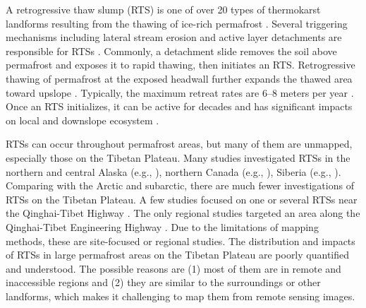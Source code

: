 \documentclass[preprint,12pt,authoryear]{elsarticle}
\begin{document}
A retrogressive thaw slump (RTS) is one of over 20 types of thermokarst landforms resulting from the thawing of ice-rich permafrost \citep{czudek_thermokarst_1970, jorgenson_response_2005, jorgenson_thermokarst_2013,kokelj2013advances}. Several triggering mechanisms including lateral stream erosion and active layer detachments are responsible for RTSs \citep{french2017periglacial}. Commonly, a detachment slide removes the soil above permafrost and exposes it to rapid thawing, then initiates an RTS. Retrogressive thawing of permafrost at the exposed headwall further expands the thawed area toward upslope \citep{jorgenson_thermokarst_2013}. Typically, the maximum retreat rates are 6--8 meters per year \citep{jorgenson_thermokarst_2013}. Once an RTS initializes, it can be active for decades \citep{burn1989geomorphology, lacelle2010climatic, swanson2018growth,lewkowicz2019extremes} and has significant impacts on local and downslope ecosystem \citep{gooseff2009effects, pierre2018unprecedented, zolkos2018mineral}. 

RTSs can occur throughout permafrost areas, but many of them are unmapped, especially those on the Tibetan Plateau. Many studies investigated RTSs in the northern and central Alaska (e.g., \citealp{swanson2018growth,balser2014timing}), northern Canada (e.g., \citealp{burn1990canadian, cassidy2017impacts, armstrong2018thaw,lewkowicz2019extremes}), Siberia (e.g., \citealp{leibman2003dynamics, zwieback2018sub}). %
Comparing with the Arctic and subarctic, there are much fewer investigations of RTSs on the Tibetan Plateau. A few studies focused on one or several RTSs near the Qinghai-Tibet Highway \citep{wang1995situ,sun2017creep}. The only regional studies targeted an area along the Qinghai-Tibet Engineering Highway \citep{niu2014thaw, niu2016thaw}. Due to the limitations of mapping methods, these are site-focused or regional studies. The distribution and impacts of RTSs in large permafrost areas on the Tibetan Plateau are poorly quantified and understood. The possible reasons are (1) most of them are in remote and inaccessible regions and (2) they are similar to the surroundings or other landforms, which makes it challenging to map them from remote sensing images.
\end{document}
